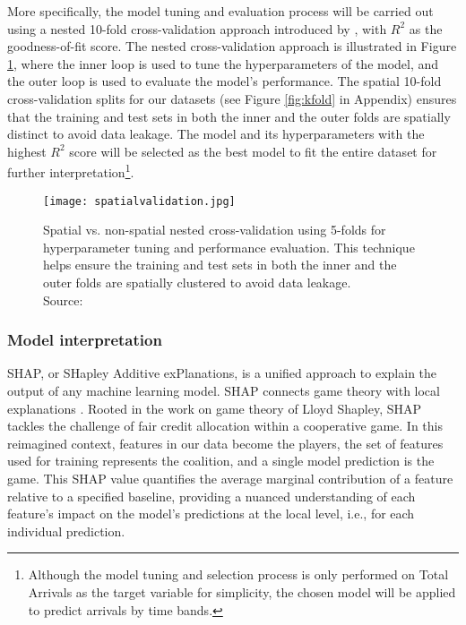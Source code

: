 More specifically, the model tuning and evaluation process will be carried out using a nested 10-fold cross-validation approach introduced by \citet{schratzPerformanceEvaluationHyperparameter2018}, with $R^2$ as the goodness-of-fit score. The nested cross-validation approach is illustrated in Figure \ref{fig:spatialnested}, where the inner loop is used to tune the hyperparameters of the model, and the outer loop is used to evaluate the model's performance. The spatial 10-fold cross-validation splits for our datasets (see Figure \ref{fig:kfold} in Appendix) ensures that the training and test sets in both the inner and the outer folds are spatially distinct to avoid data leakage. The model and its hyperparameters with the highest $R^2$ score will be selected as the best model to fit the entire dataset for further interpretation\footnote{Although the model tuning and selection process is only performed on Total Arrivals as the target variable for simplicity, the chosen model will be applied to predict arrivals by time bands.}.

\begin{figure}[!ht]
    \centering
    \texttt{[image: spatialvalidation.jpg]}
    \captionsetup{justification=centering}
    \caption{Spatial vs. non-spatial nested cross-validation using 5-folds for hyperparameter tuning and performance evaluation. This technique helps ensure the training and test sets in both the inner and the outer folds are spatially clustered to avoid data leakage. \\ Source: \citet{schratzPerformanceEvaluationHyperparameter2018}}
    \label{fig:spatialnested}
\end{figure}

\subsubsection*{Model interpretation}

SHAP, or SHapley Additive exPlanations, is a unified approach to explain the output of any machine learning model. SHAP connects game theory with local explanations \citep{lundbergUnifiedApproachInterpreting2017a}. Rooted in the work on game theory of Lloyd Shapley, SHAP tackles the challenge of fair credit allocation within a cooperative game. In this reimagined context, features in our data become the players, the set of features used for training represents the coalition, and a single model prediction is the game. This SHAP value quantifies the average marginal contribution of a feature relative to a specified baseline, providing a nuanced understanding of each feature's impact on the model's predictions at the local level, i.e., for each individual prediction.

